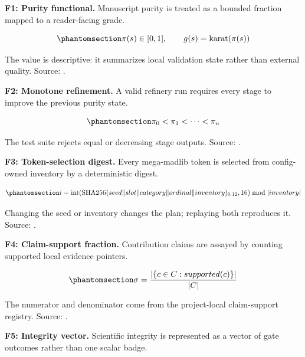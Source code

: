 \documentclass[
]{article}
\begin{document}
\textbf{F1: Purity functional.} Manuscript purity is treated as a
bounded fraction mapped to a reader-facing grade.

\begin{equation}\protect\phantomsection\label{eq:purity_functional}{
\pi(s) \in [0, 1], \qquad g(s) = \operatorname{karat}(\pi(s))
}\end{equation}

The value is descriptive: it summarizes local validation state rather
than external quality. Source: .

\textbf{F2: Monotone refinement.} A valid refinery run requires every
stage to improve the previous purity state.

\begin{equation}\protect\phantomsection\label{eq:monotone_refinery}{
\pi_0 < \pi_1 < \cdots < \pi_n
}\end{equation}

The test suite rejects equal or decreasing stage outputs. Source:
.

\textbf{F3: Token-selection digest.} Every mega-madlib token is selected
from config-owned inventory by a deterministic digest.

\begin{equation}\protect\phantomsection\label{eq:token_digest}{
i = \operatorname{int}(\operatorname{SHA256}(seed \Vert slot \Vert category \Vert ordinal \Vert inventory)_{0:12}, 16) \bmod \lvert inventory \rvert
}\end{equation}

Changing the seed or inventory changes the plan; replaying both
reproduces it. Source: .

\textbf{F4: Claim-support fraction.} Contribution claims are assayed by
counting supported local evidence pointers.

\begin{equation}\protect\phantomsection\label{eq:claim_support}{
\sigma = \frac{\lvert\{c \in C : supported(c)\}\rvert}{\lvert C \rvert}
}\end{equation}

The numerator and denominator come from the project-local claim-support
registry. Source:
.

\textbf{F5: Integrity vector.} Scientific integrity is represented as a
vector of gate outcomes rather than one scalar badge.
\end{document}

